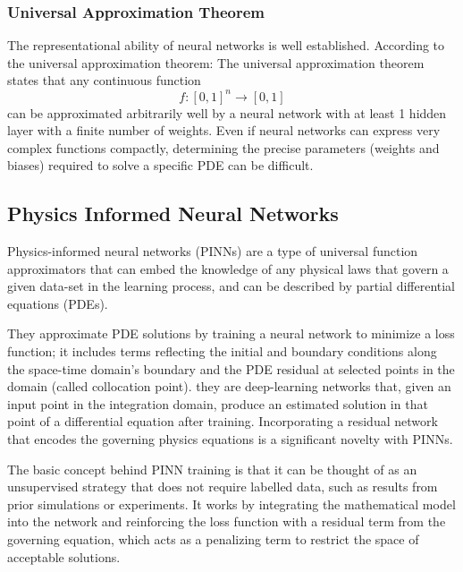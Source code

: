 \documentclass{article}
\begin{document}
\subsubsection{Universal Approximation Theorem}

The representational ability of neural networks is well established. According to the universal approximation theorem:
The universal approximation theorem states that any continuous function  $$f : [0, 1]^{n} \rightarrow [0, 1]$$  can be approximated arbitrarily well by a neural network with at least 1 hidden layer with a finite number of weights.
Even if neural networks can express very complex functions compactly, determining the precise parameters (weights and biases) required to solve a specific PDE can be difficult.


\subsection{Physics Informed Neural Networks}

Physics-informed neural networks (PINNs) are a type of universal function approximators that can embed the knowledge of any physical laws that govern a given data-set in the learning process, and can be described by partial differential equations (PDEs).

They approximate PDE solutions by training a neural network to minimize a loss function; it includes terms reflecting the initial and boundary conditions along the space-time domain’s boundary and the PDE residual at selected points in the domain (called collocation point). 
they are deep-learning networks that, given an input point in the integration domain, produce an estimated solution in that point of a differential equation after training. Incorporating a residual network that encodes the governing physics equations is a significant novelty with PINNs. 

The basic concept behind PINN training is that it can be thought of as an unsupervised strategy that does not require labelled data, such as results from prior simulations or experiments.
It works by integrating the mathematical model into the network and reinforcing the loss function with a residual term from the governing equation, which acts as a penalizing term to restrict the space of acceptable solutions.
\end{document}
